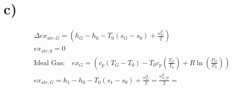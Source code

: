 

\section*{c)}
\begin{align*}
&\Delta ex_{str,G} = (h_G - h_0 - T_0(s_G - s_0) + \frac{\omega_G^2}{2}) \\
&ex_{str,0} = 0 \\
&\text{Ideal Gas:} \quad ex_G = (c_p(T_G - T_0) - T_0 c_p \left( \frac{T_G}{T_0} \right) + R \ln \left( \frac{P_G}{P_0} \right)) \\
&ex_{str,G} = h_1 - h_0 - T_0(s_1 - s_0) + \frac{\omega_G^2}{2} = \frac{\omega_{u,ft}^2}{2} = 
\end{align*}